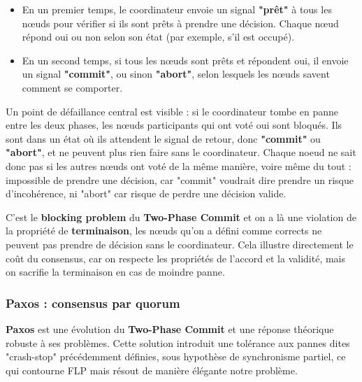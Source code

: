 \documentclass[12pt,a4paper]{article}
\begin{document}
\vspace{0.25cm}
\begin{itemize}
    \item En un premier temps, le coordinateur envoie un signal \textbf{"prêt"} à tous les nœuds pour vérifier si ils sont prêts à prendre une décision. Chaque nœud répond oui ou non selon son état (par exemple, s'il est occupé).
    \item En un second temps, si tous les nœuds sont prêts et répondent oui, il envoie un signal \textbf{"commit"}, ou sinon \textbf{"abort"}, selon lesquels les nœuds savent comment se comporter.
\end{itemize}
\vspace{0.25cm}

Un point de défaillance central est visible : si le coordinateur tombe en panne entre les deux phases, les nœuds participants qui ont voté oui sont bloqués. Ils sont dans un état où ils attendent le signal de retour, donc \textbf{"commit"} ou \textbf{"abort"}, et ne peuvent plus rien faire sans le coordinateur. Chaque noeud ne sait donc pas si les autres nœuds ont voté de la même manière, voire même du tout : impossible de prendre une décision, car "commit" voudrait dire prendre un risque d'incohérence, ni "abort" car risque de perdre une décision valide. 

\vspace{0.25cm}

C'est le \textbf{blocking problem} du \textbf{Two-Phase Commit} et on a là une violation de la propriété de \textbf{terminaison}, les nœuds qu'on a défini comme corrects ne peuvent pas prendre de décision sans le coordinateur. Cela illustre directement le coût du consensus, car on respecte les propriétés de l'accord et la validité, mais on sacrifie la terminaison en cas de moindre panne.

\subsubsection{Paxos : consensus par quorum}
\textbf{Paxos}\cite{PaxosSimple2001} est une évolution du \textbf{Two-Phase Commit}\cite{GrayLamport2006} et une réponse théorique robuste à ses problèmes. Cette solution introduit une tolérance aux pannes dites "crash-stop" précédemment définies, sous hypothèse de synchronisme partiel, ce qui contourne FLP mais résout de manière élégante notre problème.

\vspace{0.25cm}
\end{document}
